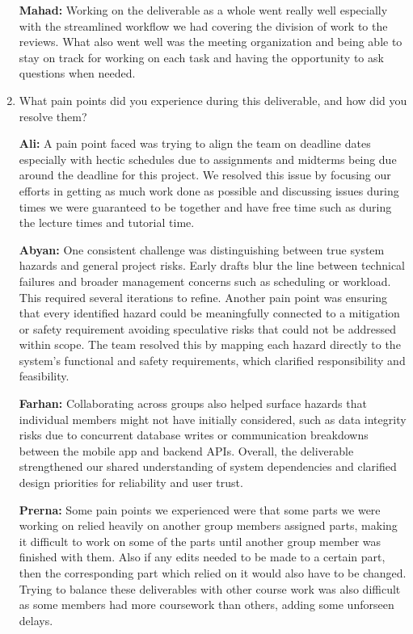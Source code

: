 \documentclass{article}
\begin{document}
\begin{enumerate}
    \textbf{Mahad:} Working on the deliverable as a whole went really well especially with the streamlined workflow we had covering the division of work to the reviews. What also went well was the meeting organization and being able to stay on track for working on each task and having the opportunity to ask questions when needed.


    \item What pain points did you experience during this deliverable, and how
    did you resolve them?

    \textbf{Ali:} A pain point faced was trying to align the team on deadline dates especially with hectic schedules due to assignments and midterms being due around the deadline for this project. We resolved this issue by focusing our efforts in getting as much work done as possible and discussing issues during times we were guaranteed to be together and have free time such as during the lecture times and tutorial time.

    \textbf{Abyan:} One consistent challenge was distinguishing between true system hazards and general project risks. Early drafts blur the line between technical failures and broader management concerns such as scheduling or workload. This required several iterations to refine. Another pain point was ensuring that every identified hazard could be meaningfully connected to a mitigation or safety requirement avoiding speculative risks that could not be addressed within scope. The team resolved this by mapping each hazard directly to the system’s functional and safety requirements, which clarified responsibility and feasibility.

    \textbf{Farhan:} Collaborating across groups also helped surface hazards that individual members might not have initially considered, such as data integrity risks due to concurrent database writes or communication breakdowns between the mobile app and backend APIs. Overall, the deliverable strengthened our shared understanding of system dependencies and clarified design priorities for reliability and user trust.

    \textbf{Prerna:} Some pain points we experienced were that some parts we were working on relied heavily on another group members assigned parts, making it difficult to work on some of the parts until another group member was finished with them. Also if any edits needed to be made to a certain part, then the corresponding part which relied on it would also have to be changed. Trying to balance these deliverables with other course work was also difficult as some members had more coursework than others, adding some unforseen delays.


\end{enumerate}
\end{document}
